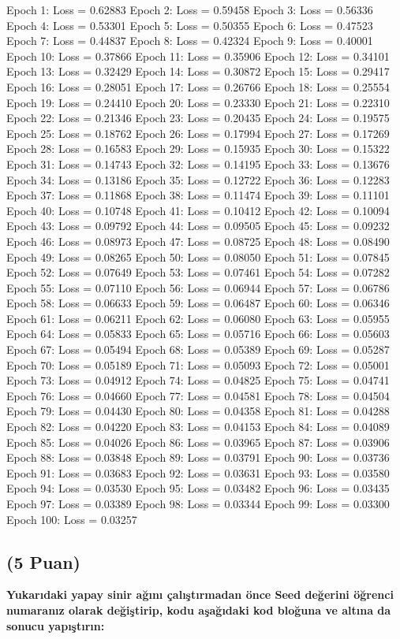 \documentclass[11pt]{article}
\begin{document}
Epoch 1: Loss = 0.62883
Epoch 2: Loss = 0.59458
Epoch 3: Loss = 0.56336
Epoch 4: Loss = 0.53301
Epoch 5: Loss = 0.50355
Epoch 6: Loss = 0.47523
Epoch 7: Loss = 0.44837
Epoch 8: Loss = 0.42324
Epoch 9: Loss = 0.40001
Epoch 10: Loss = 0.37866
Epoch 11: Loss = 0.35906
Epoch 12: Loss = 0.34101
Epoch 13: Loss = 0.32429
Epoch 14: Loss = 0.30872
Epoch 15: Loss = 0.29417
Epoch 16: Loss = 0.28051
Epoch 17: Loss = 0.26766
Epoch 18: Loss = 0.25554
Epoch 19: Loss = 0.24410
Epoch 20: Loss = 0.23330
Epoch 21: Loss = 0.22310
Epoch 22: Loss = 0.21346
Epoch 23: Loss = 0.20435
Epoch 24: Loss = 0.19575
Epoch 25: Loss = 0.18762
Epoch 26: Loss = 0.17994
Epoch 27: Loss = 0.17269
Epoch 28: Loss = 0.16583
Epoch 29: Loss = 0.15935
Epoch 30: Loss = 0.15322
Epoch 31: Loss = 0.14743
Epoch 32: Loss = 0.14195
Epoch 33: Loss = 0.13676
Epoch 34: Loss = 0.13186
Epoch 35: Loss = 0.12722
Epoch 36: Loss = 0.12283
Epoch 37: Loss = 0.11868
Epoch 38: Loss = 0.11474
Epoch 39: Loss = 0.11101
Epoch 40: Loss = 0.10748
Epoch 41: Loss = 0.10412
Epoch 42: Loss = 0.10094
Epoch 43: Loss = 0.09792
Epoch 44: Loss = 0.09505
Epoch 45: Loss = 0.09232
Epoch 46: Loss = 0.08973
Epoch 47: Loss = 0.08725
Epoch 48: Loss = 0.08490
Epoch 49: Loss = 0.08265
Epoch 50: Loss = 0.08050
Epoch 51: Loss = 0.07845
Epoch 52: Loss = 0.07649
Epoch 53: Loss = 0.07461
Epoch 54: Loss = 0.07282
Epoch 55: Loss = 0.07110
Epoch 56: Loss = 0.06944
Epoch 57: Loss = 0.06786
Epoch 58: Loss = 0.06633
Epoch 59: Loss = 0.06487
Epoch 60: Loss = 0.06346
Epoch 61: Loss = 0.06211
Epoch 62: Loss = 0.06080
Epoch 63: Loss = 0.05955
Epoch 64: Loss = 0.05833
Epoch 65: Loss = 0.05716
Epoch 66: Loss = 0.05603
Epoch 67: Loss = 0.05494
Epoch 68: Loss = 0.05389
Epoch 69: Loss = 0.05287
Epoch 70: Loss = 0.05189
Epoch 71: Loss = 0.05093
Epoch 72: Loss = 0.05001
Epoch 73: Loss = 0.04912
Epoch 74: Loss = 0.04825
Epoch 75: Loss = 0.04741
Epoch 76: Loss = 0.04660
Epoch 77: Loss = 0.04581
Epoch 78: Loss = 0.04504
Epoch 79: Loss = 0.04430
Epoch 80: Loss = 0.04358
Epoch 81: Loss = 0.04288
Epoch 82: Loss = 0.04220
Epoch 83: Loss = 0.04153
Epoch 84: Loss = 0.04089
Epoch 85: Loss = 0.04026
Epoch 86: Loss = 0.03965
Epoch 87: Loss = 0.03906
Epoch 88: Loss = 0.03848
Epoch 89: Loss = 0.03791
Epoch 90: Loss = 0.03736
Epoch 91: Loss = 0.03683
Epoch 92: Loss = 0.03631
Epoch 93: Loss = 0.03580
Epoch 94: Loss = 0.03530
Epoch 95: Loss = 0.03482
Epoch 96: Loss = 0.03435
Epoch 97: Loss = 0.03389
Epoch 98: Loss = 0.03344
Epoch 99: Loss = 0.03300
Epoch 100: Loss = 0.03257

\subsection{(5 Puan)} \textbf{Yukarıdaki yapay sinir ağını çalıştırmadan önce Seed değerini öğrenci numaranız olarak değiştirip, kodu aşağıdaki kod bloğuna ve altına da sonucu yapıştırın:}
\end{document}
